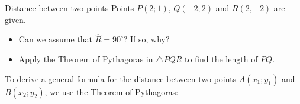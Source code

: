 \begin{activity}{Distance between two points}
Points $P(2;1)$, $Q(-2;2)$ and $R(2,-2)$ are given. 
\begin{itemize}
 \item Can we assume that $\hat{R}=90^{\circ}$? If so, why?
\item Apply the Theorem of Pythagoras in $\triangle PQR$ to find the length of $PQ$.
\end{itemize}


\setcounter{subfigure}{0}
\begin{figure}[H] %
\begin{center}
\end{center}
\label{fig:trianglePQR}
\end{figure} 
\end{activity}       
%       
To derive a general formula for the distance between two points $A({x}_{1};{y}_{1})$ and $B({x}_{2};{y}_{2})$, we use the Theorem of Pythagoras:\par 


